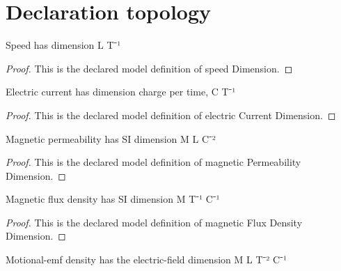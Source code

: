 \section{Declaration topology}
\begin{definition}
  \label{def:physics:phyx-mini-0883:phyxminiproblems-problemphyxmini0883-speeddimension}
  Speed has dimension L T⁻¹
\end{definition}
\begin{proof}
  This is the declared model definition of speed Dimension.
\end{proof}
\begin{definition}
  \label{def:physics:phyx-mini-0883:phyxminiproblems-problemphyxmini0883-electriccurrentdimension}
  Electric current has dimension charge per time, C T⁻¹
\end{definition}
\begin{proof}
  This is the declared model definition of electric Current Dimension.
\end{proof}
\begin{definition}
  \label{def:physics:phyx-mini-0883:phyxminiproblems-problemphyxmini0883-magneticpermeabilitydimension}
  Magnetic permeability has SI dimension M L C⁻²
\end{definition}
\begin{proof}
  This is the declared model definition of magnetic Permeability Dimension.
\end{proof}
\begin{definition}
  \label{def:physics:phyx-mini-0883:phyxminiproblems-problemphyxmini0883-magneticfluxdensitydimension}
  Magnetic flux density has SI dimension M T⁻¹ C⁻¹
\end{definition}
\begin{proof}
  This is the declared model definition of magnetic Flux Density Dimension.
\end{proof}
\begin{definition}
  \label{def:physics:phyx-mini-0883:phyxminiproblems-problemphyxmini0883-electricfielddimension}
  Motional-emf density has the electric-field dimension M L T⁻² C⁻¹
\end{definition}
